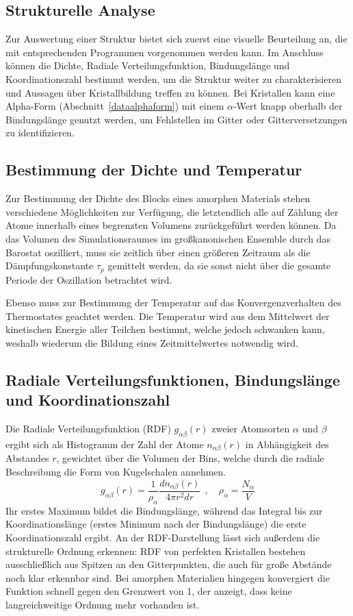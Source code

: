\subsection{Strukturelle Analyse}

Zur Auswertung einer Struktur bietet sich zuerst eine visuelle Beurteilung an, die mit entsprechenden Programmen vorgenommen werden kann.
Im Anschluss können die Dichte, Radiale Verteilungsfunktion, Bindungslänge und Koordinationszahl bestimmt werden, um die Struktur weiter zu charakterisieren und Aussagen über Kristallbildung treffen zu können.
Bei Kristallen kann eine Alpha-Form (Abschnitt~\ref{dataalphaform}) mit einem $\alpha$-Wert knapp oberhalb der Bindungslänge genutzt werden, um Fehlstellen im Gitter oder Gitterversetzungen zu identifizieren.

\subsection{Bestimmung der Dichte und Temperatur}

Zur Bestimmung der Dichte des Blocks eines amorphen Materials stehen verschiedene Möglichkeiten zur Verfügung, die letztendlich alle auf Zählung der Atome innerhalb eines begrenzten Volumens zurückgeführt werden können.
Da das Volumen des Simulationsraumes im großkanonischen Ensemble durch das Barostat oszilliert, muss sie zeitlich über einen größeren Zeitraum als die Dämpfungskonstante $\tau_p$ gemittelt werden, da sie sonst nicht über die gesamte Periode der Oszillation betrachtet wird.

Ebenso muss zur Bestimmung der Temperatur auf das Konvergenzverhalten des Thermostates geachtet werden.
Die Temperatur wird aus dem Mittelwert der kinetischen Energie aller Teilchen bestimmt, welche jedoch schwanken kann, weshalb wiederum die Bildung eines Zeitmittelwertes notwendig wird.

\subsection{Radiale Verteilungsfunktionen, Bindungslänge und Koordinationszahl}

Die Radiale Verteilungsfunktion (RDF) $g_{\alpha\beta}(r)$ zweier Atomsorten $\alpha$ und $\beta$ ergibt sich als Histogramm der Zahl der Atome $n_{\alpha\beta}(r)$ in Abhängigkeit des Abstandes $r$, gewichtet über die Volumen der Bins, welche durch die radiale Beschreibung die Form von Kugelschalen annehmen.
\begin{equation}
  g_{\alpha\beta}(r) = \frac{1}{\rho_\alpha} \frac{d n_{\alpha\beta}(r)}{4 \pi r^2 dr} ~~,\quad \rho_\alpha = \frac{N_\alpha}{V}
\end{equation}
Ihr erstes Maximum bildet die Bindungslänge, während das Integral bis zur Koordinationslänge (erstes Minimum nach der Bindungslänge) die erste Koordinationszahl ergibt.
An der RDF-Darstellung lässt sich außerdem die strukturelle Ordnung erkennen:
RDF von perfekten Kristallen bestehen ausschließlich aus Spitzen an den Gitterpunkten, die auch für große Abstände noch klar erkennbar sind.
Bei amorphen Materialien hingegen konvergiert die Funktion schnell gegen den Grenzwert von 1, der anzeigt, dass keine langreichweitige Ordnung mehr vorhanden ist.

